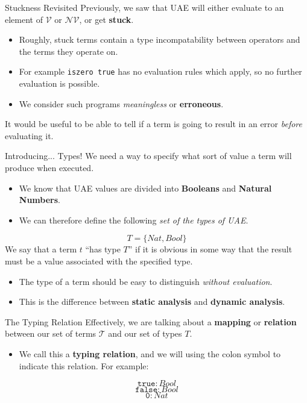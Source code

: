 \documentclass[11pt]{beamer}
\begin{document}
\begin{frame}[fragile=singleslide]{Stuckness Revisited}
Previously, we saw that UAE will either evaluate to an element of $\mathcal{V}$ or $\mathcal{NV}$, or get \textbf{stuck}.
\begin{itemize}
\item Roughly, stuck terms contain a type incompatability between operators and the terms they operate on.  
\item For example \texttt{iszero true} has no evaluation rules which apply, so no further evaluation is possible.  
\item We consider such programs \emph{meaningless} or \textbf{erroneous}.
\end{itemize}
It would be useful to be able to tell if a term is going to result in an error \emph{before} evaluating it.
\end{frame}


\begin{frame}[fragile=singleslide]{Introducing... Types!}
We need a way to specify what sort of value a term will produce when executed.  
\begin{itemize}
\item We know that UAE values are divided into \textbf{Booleans} and \textbf{Natural Numbers}.
\item We can therefore define the following \emph{set of the types of UAE}.
\end{itemize}
\begin{equation}
T = \{Nat, Bool\}
\end{equation}
We say that a term $t$ ``has type $T$'' if it is obvious in some way that the result must be a value associated with the specified type.
\begin{itemize}
\item The type of a term should be easy to distinguish \emph{without evaluation}.  
\item This is the difference between \textbf{static analysis} and \textbf{dynamic analysis}.
\end{itemize}
\end{frame}

\begin{frame}[fragile=singleslide]{The Typing Relation}
Effectively, we are talking about a \textbf{mapping} or \textbf{relation} between our set of terms $\mathcal{T}$ and our set of types $T$.  
\begin{itemize}
\item We call this a \textbf{typing relation}, and we will using the colon symbol to indicate this relation.  For example:
\end{itemize}
\begin{equation}
\texttt{true} : Bool
\end{equation}
\begin{equation}
\texttt{false} : Bool
\end{equation}
\begin{equation}
\texttt{0} : Nat
\end{equation}

\end{frame}
\end{document}
